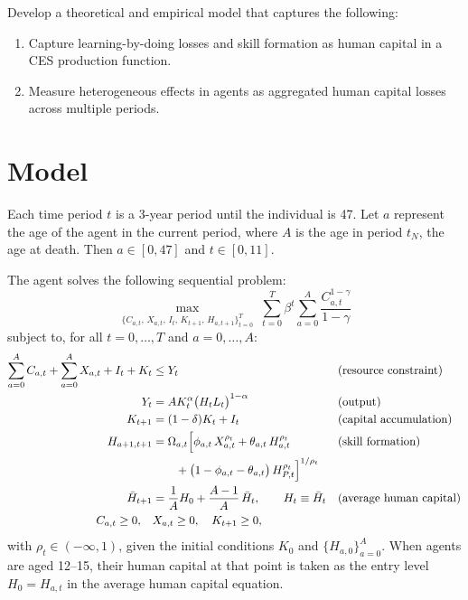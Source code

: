 \documentclass{article}
\begin{document}
\medskip
\noindent Develop a theoretical and empirical model that captures the following:
\begin{enumerate}
    \item Capture learning-by-doing losses and skill formation as human capital in a CES production function.
    \item Measure heterogeneous effects in agents as aggregated human capital losses across multiple periods.
\end{enumerate}

\section{Model}

Each time period $t$ is a 3-year period until the individual is 47. Let $a$ represent the age of the agent in the current period, where $A$ is the age in period $t_N$, the age at death. Then $a \in [0,47]$ and $t \in [0,11]$.

\medskip
\noindent The agent solves the following sequential problem:
\begin{equation}
    \max_{\{C_{a,t},\, X_{a,t},\, I_t,\, K_{t+1},\, H_{a,t+1}\}_{t=0}^{T}}
    \; \sum_{t=0}^{T} \beta^t \sum_{a=0}^{A} \frac{C_{a,t}^{1-\gamma}}{1-\gamma}
\end{equation}
subject to, for all $t = 0, \dots, T$ and $a = 0, \dots, A$:
\begin{align}
    \sum_{a=0}^{A} C_{a,t} + \sum_{a=0}^{A} X_{a,t} + I_t + K_t &\leq Y_t
        && \text{(resource constraint)} \\
    Y_t &= A K_t^{\alpha} \big(H_t L_t\big)^{1-\alpha}
        && \text{(output)} \\
    K_{t+1} &= (1-\delta) K_t + I_t
        && \text{(capital accumulation)} \\
    H_{a+1,t+1} &= \Omega_{a,t} \Big[\phi_{a,t}\, X_{a,t}^{\rho_t} + \theta_{a,t}\, H_{a,t}^{\rho_t}
        && \text{(skill formation)} \notag \\
    &\qquad + \big(1 - \phi_{a,t} - \theta_{a,t}\big)\, H_{P,t}^{\rho_t}\Big]^{1/\rho_t} \\
    \bar{H}_{t+1} &= \frac{1}{A} H_0 + \frac{A-1}{A}\, \bar{H}_t,
        \qquad H_t \equiv \bar{H}_t
        && \text{(average human capital)} \\
    C_{a,t} \geq 0, \quad & X_{a,t} \geq 0, \quad K_{t+1} \geq 0,
\end{align}
with $\rho_t \in (-\infty, 1)$, given the initial conditions $K_0$ and $\{H_{a,0}\}_{a=0}^{A}$. When agents are aged 12--15, their human capital at that point is taken as the entry level $H_0 = H_{a,t}$ in the average human capital equation.
\end{document}
